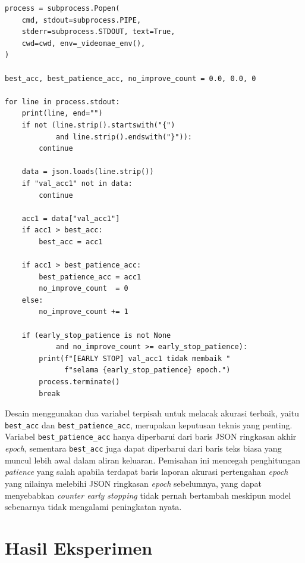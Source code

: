 \begin{lstlisting}[caption={Kode eksekusi \textit{subprocess} dan \textit{early stopping}}, label={lst:earlystop}]
process = subprocess.Popen(
    cmd, stdout=subprocess.PIPE,
    stderr=subprocess.STDOUT, text=True,
    cwd=cwd, env=_videomae_env(),
)

best_acc, best_patience_acc, no_improve_count = 0.0, 0.0, 0

for line in process.stdout:
    print(line, end="")
    if not (line.strip().startswith("{")
            and line.strip().endswith("}")):
        continue

    data = json.loads(line.strip())
    if "val_acc1" not in data:
        continue

    acc1 = data["val_acc1"]
    if acc1 > best_acc:
        best_acc = acc1

    if acc1 > best_patience_acc:
        best_patience_acc = acc1
        no_improve_count  = 0
    else:
        no_improve_count += 1

    if (early_stop_patience is not None
            and no_improve_count >= early_stop_patience):
        print(f"[EARLY STOP] val_acc1 tidak membaik "
              f"selama {early_stop_patience} epoch.")
        process.terminate()
        break
\end{lstlisting}

Desain menggunakan dua variabel terpisah untuk melacak akurasi terbaik, yaitu \texttt{best\_acc} dan \texttt{best\_patience\_acc}, merupakan keputusan teknis yang penting. Variabel \texttt{best\_patience\_acc} hanya diperbarui dari baris JSON ringkasan akhir \textit{epoch}, sementara \texttt{best\_acc} juga dapat diperbarui dari baris teks biasa yang muncul lebih awal dalam aliran keluaran. Pemisahan ini mencegah penghitungan \textit{patience} yang salah apabila terdapat baris laporan akurasi pertengahan \textit{epoch} yang nilainya melebihi JSON ringkasan \textit{epoch} sebelumnya, yang dapat menyebabkan \textit{counter early stopping} tidak pernah bertambah meskipun model sebenarnya tidak mengalami peningkatan nyata.\par

\section{Hasil Eksperimen} \label{IV.Hasil}

